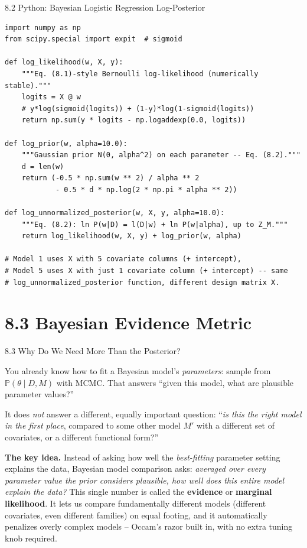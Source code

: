 \documentclass[aspectratio=169,10pt]{beamer}
\begin{document}
\begin{frame}[fragile]{8.2 Python: Bayesian Logistic Regression Log-Posterior}
\begin{lstlisting}
import numpy as np
from scipy.special import expit  # sigmoid

def log_likelihood(w, X, y):
    """Eq. (8.1)-style Bernoulli log-likelihood (numerically stable)."""
    logits = X @ w
    # y*log(sigmoid(logits)) + (1-y)*log(1-sigmoid(logits))
    return np.sum(y * logits - np.logaddexp(0.0, logits))

def log_prior(w, alpha=10.0):
    """Gaussian prior N(0, alpha^2) on each parameter -- Eq. (8.2)."""
    d = len(w)
    return (-0.5 * np.sum(w ** 2) / alpha ** 2
            - 0.5 * d * np.log(2 * np.pi * alpha ** 2))

def log_unnormalized_posterior(w, X, y, alpha=10.0):
    """Eq. (8.2): ln P(w|D) = l(D|w) + ln P(w|alpha), up to Z_M."""
    return log_likelihood(w, X, y) + log_prior(w, alpha)

# Model 1 uses X with 5 covariate columns (+ intercept),
# Model 5 uses X with just 1 covariate column (+ intercept) -- same
# log_unnormalized_posterior function, different design matrix X.
\end{lstlisting}
\end{frame}

\section{8.3 Bayesian Evidence Metric}

\begin{frame}[allowframebreaks]{8.3 Why Do We Need More Than the Posterior?}

You already know how to fit a Bayesian model's \emph{parameters}: sample from $\mathbb{P}(\theta \mid D, M)$ with MCMC. That answers ``given this model, what are plausible parameter values?''

It does \emph{not} answer a different, equally important question: ``\emph{is this the right model in the first place}, compared to some other model $M'$ with a different set of covariates, or a different functional form?''

\textbf{The key idea.} Instead of asking how well the \emph{best-fitting} parameter setting explains the data, Bayesian model comparison asks: \emph{averaged over every parameter value the prior considers plausible, how well does this entire model explain the data?} This single number is called the \textbf{evidence} or \textbf{marginal likelihood}. It lets us compare fundamentally different models (different covariates, even different families) on equal footing, and it automatically penalizes overly complex models -- Occam's razor built in, with no extra tuning knob required.

\end{frame}
\end{document}
